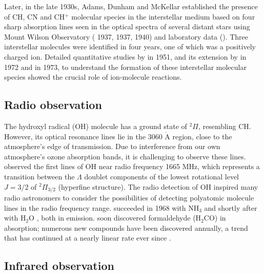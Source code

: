 Later, in the late 1930s, Adams, Dunham and McKellar established the presence of CH, CN and CH$^+$ molecular species in the interstellar medium based on four sharp absorption lines seen in the optical spectra of several distant stars using Mount Wilson Observatory (\citet{dunham_jr_interstellar_1937} 1937, \citet{adams_quoted_1937} 1937, \citet{mckellar_evidence_1940, mckellar_wave_1940} 1940) and laboratory data (\citet{jenkins_mass_1938, douglas_note_1941, douglas_band_1942}). Three interstellar molecules were identified in four years, one of which was a positively charged ion. Detailed quantitative studies by \citet{bates_density_1951} in 1951, and its extension by \citet{solomon_formation_1972} in 1972 and \citet{herbst_formation_1973} in 1973, to understand the formation of these interstellar molecular species showed the crucial role of ion-molecule reactions.

\subsection{Radio observation}
\label{subsec:intro:radio}

The hydroxyl radical (OH) molecule has a ground state of $^2\Pi$, resembling CH. However, its optical resonance lines lie in the 3060 $\mathring{\text{A}}$ region, close to the atmosphere's edge of transmission. Due to interference from our own atmosphere's ozone absorption bands, it is challenging to observe these lines. \citet{weinreb_radio_1963} \citeyear{weinreb_radio_1963} observed the first lines of OH near radio frequency 1665 MHz, which represents a transition between the $\Lambda$ doublet components of the lowest rotational level $J=3/2$ of $^2\Pi_{3/2}$ (hyperfine structure). The radio detection of OH inspired many radio astronomers to consider the possibilities of detecting polyatomic molecule lines in the radio frequency range. \citet{cheung_detection_1968} succeeded in 1968 with NH$_3$ and shortly after with H$_2$O \cite{cheung_detection_1969}, both in emission. \citet{snyder_microwave_1969} soon discovered formaldehyde (H$_2$CO) in absorption; numerous new compounds have been discovered annually, a trend that has continued at a nearly linear rate ever since \cite{mcguire_2021_2021}.

\subsection{Infrared observation}
\label{subsec:intro:IR}

